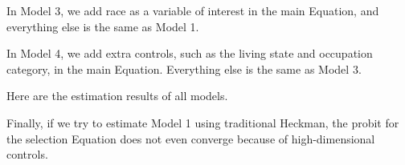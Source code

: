 In Model 3, we add race as a variable of interest in the main Equation, and
everything else is the same as Model 1.
\begin{stlog}

\end{stlog}

In Model 4, we add extra controls, such as the living state and occupation
category, in the main Equation. Everything else is the same as Model 3.
\begin{stlog}

\end{stlog}


Here are the estimation results of all models.
\begin{stlog}

\end{stlog}

Finally, if we try to estimate Model 1 using traditional Heckman, the probit for
the selection Equation does not even converge because of high-dimensional
controls. 
